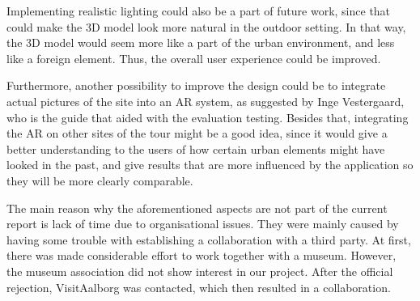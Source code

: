 Implementing realistic lighting could also be a part of future work, since that could make the 3D model look more natural in the outdoor setting. In that way, the 3D model would seem more like a part of the urban environment, and less like a foreign element. Thus, the overall user experience could be improved.

Furthermore, another possibility to improve the design could be to integrate actual pictures of the site into an AR system, as suggested by Inge Vestergaard, who is the guide that aided with the evaluation testing. Besides that, integrating the AR on other sites of the tour might be a good idea, since it would give a better understanding to the users of how certain urban elements might have looked in the past, and give results that are more influenced by the application so they will be more clearly comparable. 

The main reason why the aforementioned aspects are not part of the current report is lack of time due to organisational issues. They were mainly caused by having some trouble with establishing a collaboration with a third party. At first, there was made considerable effort to work together with a museum. However, the museum association did not show interest in our project. After the official rejection, VisitAalborg was contacted, which then resulted in a collaboration. 

